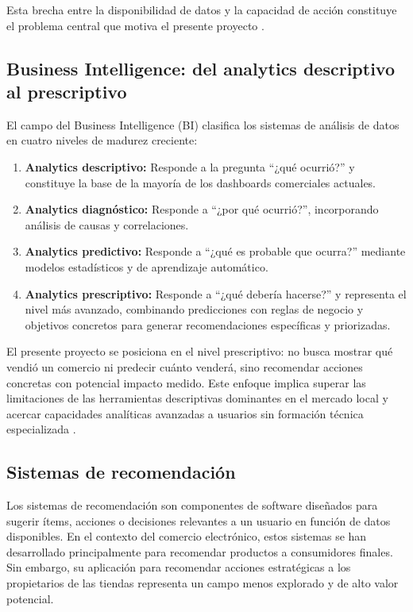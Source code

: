 Esta brecha entre la disponibilidad de datos y la capacidad de acción constituye el problema central que motiva el presente proyecto \parencite{Davenport2007, Provost2013}.

\subsection{Business Intelligence: del analytics descriptivo al prescriptivo}
\label{sec:business-intelligence}

El campo del Business Intelligence (BI) clasifica los sistemas de análisis de datos en cuatro niveles de madurez creciente:

\begin{enumerate}
    \item \textbf{Analytics descriptivo:} Responde a la pregunta ``¿qué ocurrió?'' y constituye la base de la mayoría de los dashboards comerciales actuales.

    \item \textbf{Analytics diagnóstico:} Responde a ``¿por qué ocurrió?'', incorporando análisis de causas y correlaciones.

    \item \textbf{Analytics predictivo:} Responde a ``¿qué es probable que ocurra?'' mediante modelos estadísticos y de aprendizaje automático.

    \item \textbf{Analytics prescriptivo:} Responde a ``¿qué debería hacerse?'' y representa el nivel más avanzado, combinando predicciones con reglas de negocio y objetivos concretos para generar recomendaciones específicas y priorizadas.
\end{enumerate}

El presente proyecto se posiciona en el nivel prescriptivo: no busca mostrar qué vendió un comercio ni predecir cuánto venderá, sino recomendar acciones concretas con potencial impacto medido. Este enfoque implica superar las limitaciones de las herramientas descriptivas dominantes en el mercado local y acercar capacidades analíticas avanzadas a usuarios sin formación técnica especializada \parencite{Lepenioti2020, Negash2004}.

\subsection{Sistemas de recomendación}
\label{sec:sistemas-recomendacion}

Los sistemas de recomendación son componentes de software diseñados para sugerir ítems, acciones o decisiones relevantes a un usuario en función de datos disponibles. En el contexto del comercio electrónico, estos sistemas se han desarrollado principalmente para recomendar productos a consumidores finales. Sin embargo, su aplicación para recomendar acciones estratégicas a los propietarios de las tiendas representa un campo menos explorado y de alto valor potencial.

